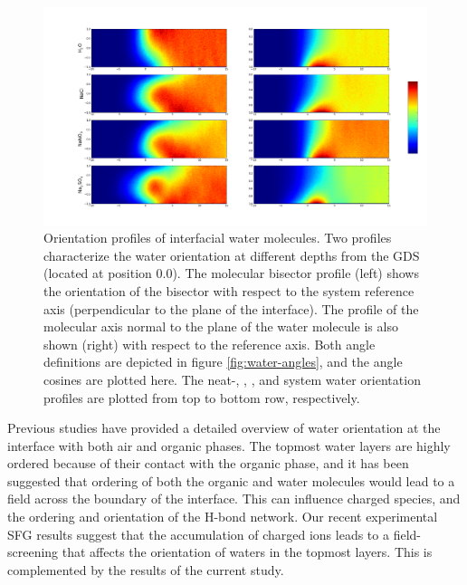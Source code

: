 \begin{figure}[h!]
\begin{center}
	\includegraphics[scale=1.0]{images/h2o-2dhistograms.png}
	\caption{Orientation profiles of interfacial water molecules. Two profiles characterize the water orientation at different depths from the GDS (located at position 0.0). The molecular bisector profile (left) shows the orientation of the bisector with respect to the system reference axis (perpendicular to the plane of the interface). The profile of the molecular axis normal to the plane of the water molecule is also shown (right) with respect to the reference axis. Both angle definitions are depicted in figure \ref{fig:water-angles}, and the angle cosines are plotted here. The neat-\wat, \nacl, \sodnit, and \sodsul system water orientation profiles are plotted from top to bottom row, respectively.}
	\label{fig:2dhisto}
\end{center}
\end{figure}

Previous studies have provided a detailed overview of water orientation at the interface with both air and organic phases.\cite{McFearin2009,Hore2008,Fan2009,Wick2006c,Wick2008a} The topmost water layers are highly ordered because of their contact with the organic phase, and it has been suggested that ordering of both the organic and water molecules would lead to a field across the boundary of the interface.\cite{McFearin2009,Hore2008} This can influence charged species, and the ordering and orientation of the H-bond network. Our recent experimental SFG results suggest that the accumulation of charged ions leads to a field-screening that affects the orientation of waters in the topmost layers. This is complemented by the results of the current study.

